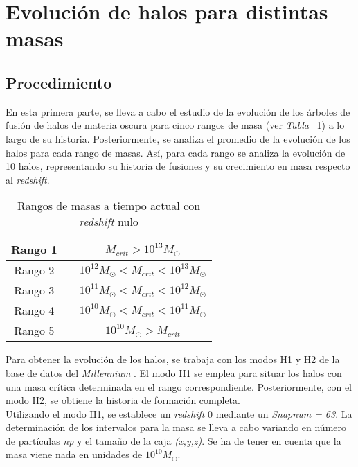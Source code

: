 \section{Evolución de halos para distintas masas} 
\label{sec:2} %

\subsection{Procedimiento}
\label{subsec:2_A}

En esta primera parte, se lleva a cabo el estudio de la evolución de los árboles de fusión de halos de materia oscura para cinco rangos de masa (ver \textit{Tabla} ~\ref{tab:tabla2}) a lo largo de su historia. Posteriormente, se analiza el promedio de la evolución de los halos para cada rango de masas. Así, para cada rango se analiza la evolución de 10 halos, representando su historia de fusiones y su crecimiento en masa respecto al \textit{redshift}.   \\

\begin{table}[H]
\begin{center}
\begin{tabular}{ccc}
\toprule
\cellcolor[gray]{0.9}Rango 1 & & $M_{crit}>10^{13}M_\odot$ \\
\midrule
\cellcolor[gray]{0.9}Rango 2 & & $10^{12}M_\odot<M_{crit}<10^{13}M_\odot$ \\
\midrule
\cellcolor[gray]{0.9}Rango 3 & & $10^{11}M_\odot<M_{crit}<10^{12}M_\odot$ \\
\midrule
\cellcolor[gray]{0.9}Rango 4 & & $10^{10}M_\odot<M_{crit}<10^{11}M_\odot$ \\
\midrule
\cellcolor[gray]{0.9}Rango 5 & & $10^{10}M_\odot>M_{crit}$ \\
\bottomrule
\end{tabular}
\end{center}
\caption{Rangos de masas a tiempo actual con \textit{redshift} nulo}
\label{tab:tabla2}
\end{table}

Para obtener la evolución de los halos, se trabaja con los modos H1 y H2 de la base de datos del \textit{Millennium} \cite{6}. El modo H1 se emplea para situar los halos con una masa crítica determinada en el rango correspondiente. Posteriormente, con el modo H2, se obtiene la historia de formación completa. \\

Utilizando el modo H1, se establece un \textit{redshift} 0 mediante un \textit{Snapnum = 63}. La determinación de los intervalos para la masa se lleva a cabo variando en número de partículas \textit{np} y el tamaño de la caja \textit{(x,y,z)}. Se ha de tener en cuenta que la masa viene nada en unidades de $10^{10}M_\odot$. \\

